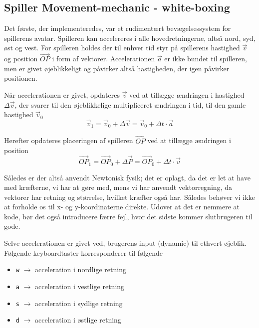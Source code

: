 \subsection{Spiller Movement-mechanic - white-boxing}
Det første, der implementeredes, var et rudimentært bevægelsessystem for spillerens avatar. Spilleren kan accelereres i alle hovedretningerne, altså nord, syd, øst og vest. For spilleren holdes der til enhver tid styr på spillerens hastighed $\vec{v}$ og position $\vec{OP}$ i form af vektorer. Accelerationen $\vec{a}$ er ikke bundet til spilleren, men er givet øjeblikkeligt og påvirker altså hastigheden, der igen påvirker positionen.

Når accelerationen er givet, opdateres $\vec{v}$ ved at tillægge ændringen i hastighed $\Delta \vec{v}$, der svarer til den øjeblikkelige multipliceret ændringen i tid, til den gamle hastighed $\vec{v}_0$
\begin{equation}
\vec{v}_1 = \vec{v}_0 + \Delta \vec{v} = \vec{v}_0 + \Delta t \cdot \vec{a}
\end{equation}

Herefter opdateres placeringen af spilleren $\vec{OP}$ ved at tillægge ændringen i position
\begin{equation}
\vec{OP}_1 = \vec{OP}_0 + \Delta \vec{P} = \vec{OP}_0 + \Delta t \cdot \vec{v}
\end{equation}

Således er der altså anvendt Newtonisk fysik; det er oplagt, da det er let at have med kræfterne, vi har at gøre med, mens vi har anvendt vektorregning, da vektorer har retning og størrelse, hvilket kræfter også har. Således behøver vi ikke at forholde os til x- og y-koordinaterne direkte. Udover at det er nemmere at kode, bør det også introducere færre fejl, hvor det sidste kommer slutbrugeren til gode.

Selve accelerationen er givet ved, brugerens input (dynamic) til ethvert øjeblik. Følgende keyboardtaster korresponderer til følgende
\begin{itemize}
  \item \texttt{w} $\rightarrow$ acceleration i nordlige retning
  \item \texttt{a} $\rightarrow$ acceleration i vestlige retning
  \item \texttt{s} $\rightarrow$ acceleration i sydlige retning
  \item \texttt{d} $\rightarrow$ acceleration i østlige retning
\end{itemize}

